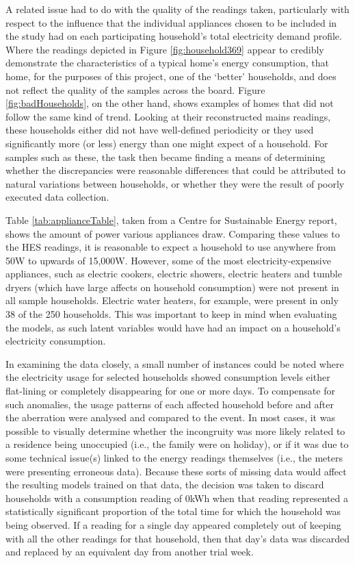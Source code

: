 A related issue had to do with the quality of the readings taken, particularly with respect to the influence that the individual appliances chosen to be included in the study had on each participating household's total electricity demand profile. Where the readings depicted in Figure \ref{fig:household369} appear to credibly demonstrate the characteristics of a typical home's energy consumption, that home, for the purposes of this project, one of the `better' households, and does not reflect the quality of the samples across the board.  Figure \ref{fig:badHouseholds}, on the other hand, shows examples of homes that did not follow the same kind of trend. Looking at their reconstructed mains readings, these households either did not have well-defined periodicity or they used significantly more (or less) energy than one might expect of a household.  For samples such as these, the task then became finding a means of determining whether the discrepancies were reasonable differences that could be attributed to natural variations between households, or whether they were the result of poorly executed data collection. 

\badHouseholds

Table \ref{tab:applianceTable}, taken from a Centre for Sustainable Energy \cite{CSE} report, shows the amount of power various appliances draw. Comparing these values to the HES readings, it is reasonable to expect a household to use anywhere from 50W to upwards of 15,000W. However, some of the most electricity-expensive appliances, such as electric cookers, electric showers, electric heaters and tumble dryers (which have large affects on household consumption) were not present in all sample households. Electric water heaters, for example, were present in only 38 of the 250 households. This was important to keep in mind when evaluating the models, as such latent variables would have had an impact on a household's electricity consumption.

\bigskip

\applianceTable


In examining the data closely, a small number of instances could be noted where the electricity usage for selected households showed consumption levels either flat-lining or completely disappearing for one or more days. To compensate for such anomalies, the usage patterns of each affected household before and after the aberration were analysed and compared to the event. In most cases, it was possible to visually determine whether the incongruity was more likely related to a residence being unoccupied (i.e., the family were on holiday), or if it was due to some technical issue(s) linked to the energy readings themselves (i.e., the meters were presenting erroneous data). Because these sorts of missing data would affect the resulting models trained on that data, the decision was taken to discard households with a consumption reading of 0kWh when that reading represented a statistically significant proportion of the total time for which the household was being observed.  If a reading for a single day appeared completely out of keeping with all the other readings for that household, then that day's data was discarded and replaced by an equivalent day from another trial week.

